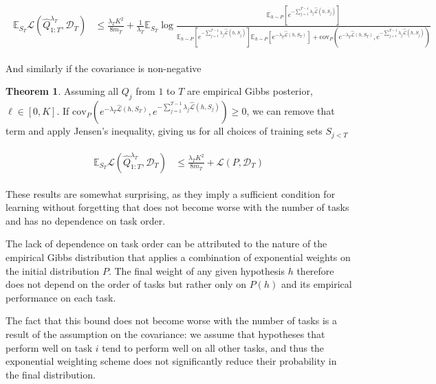 \documentclass[letterpaper]{article}
\theoremstyle{definition}
\newtheorem{theorem}{Theorem}
\begin{document}
\begin{align} \label{eq-oracle-forward-extend}
\begin{split}
\mathbb{E}_{S_T}\mathcal{L}(\hat{Q}^{\lambda_T}_{1:T}, \mathcal{D}_T) &\leq \frac{\lambda_T K^2}{8m_T}+\frac{1}{\lambda_T}\mathbb{E}_{S_T}\log\frac{\mathbb{E}_{h\sim P}\left [e^{-\sum_{j=1}^{T-1}\lambda_j\hat{\mathcal{L}}(h,S_j)} \right ]}{\mathbb{E}_{h\sim P}\left [e^{-\sum_{j=1}^{T-1}\lambda_j\hat{\mathcal{L}}(h,S_j)} \right ]\mathbb{E}_{h\sim P}\left [e^{-\lambda_T\hat{\mathcal{L}}(h,S_T)} \right ]+\mathrm{cov}_{P}(e^{-\lambda_T\hat{\mathcal{L}}(h,S_T)}, e^{-\sum_{j=1}^{T-1}\lambda_j\hat{\mathcal{L}}(h,S_j)})}
\end{split}
\end{align}

And similarly if the covariance is non-negative

\begin{theorem} 
Assuming all $Q_j$ from $1$ to $T$ are empirical Gibbs posterior, $\ell\in[0,K]$.
If $\mathrm{cov}_{P}(e^{-\lambda_T\hat{\mathcal{L}}(h,S_T)}, e^{-\sum_{j=1}^{T-1}\lambda_j\hat{\mathcal{L}}(h,S_j)})\geq 0$,
we can remove that term and apply Jensen's inequality, giving us for all choices of training sets $S_{j< T}$

\begin{align} 
\begin{split}
\mathbb{E}_{S_T}\mathcal{L}(\hat{Q}^{\lambda_T}_{1:T}, \mathcal{D}_T) &\leq \frac{\lambda_T K^2}{8m_T}+\mathcal{L}(P,\mathcal{D}_T)
\end{split}
\end{align}
\end{theorem}

These results are somewhat surprising, as they imply a sufficient condition for learning without forgetting that does not become worse with the number of tasks and has no dependence on task order.

The lack of dependence on task order can be attributed to the nature of the empirical Gibbs distribution that applies a combination of exponential weights on the initial distribution $P$. The final weight of any given hypothesis $h$ therefore does not depend on the order of tasks but rather only on $P(h)$ and its empirical performance on each task.

The fact that this bound does not become worse with the number of tasks is a result of the assumption on the covariance: we assume that hypotheses that perform well on task $i$ tend to perform well on all other tasks, and thus the exponential weighting scheme does not significantly reduce their probability in the final distribution. 
\end{document}
